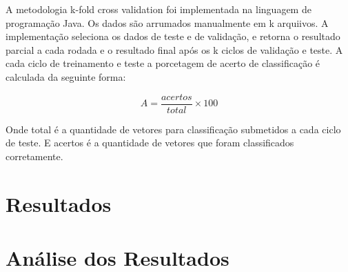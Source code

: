 A metodologia k-fold cross validation foi implementada na linguagem de programação Java. Os dados são arrumados manualmente em k arquiivos. A implementação seleciona os dados de teste e de validação, e retorna o resultado parcial a cada rodada e o resultado final após os k ciclos de validação e teste. A cada ciclo de treinamento e teste a porcetagem de acerto de classificação é calculada da seguinte forma:

$$A = \frac{acertos}{total}\times 100$$

Onde total é a quantidade de vetores para classificação submetidos a cada ciclo de teste. E acertos é a quantidade de vetores que foram classificados corretamente.

\section{Resultados}

\section{Análise dos Resultados}
